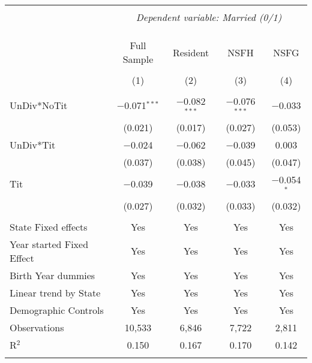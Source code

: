 
\begingroup 
\footnotesize 
\begin{tabular}{@{\extracolsep{5pt}}lcccc} 
\\[-1.8ex]\hline 
\hline \\[-1.8ex] 
 & \multicolumn{4}{c}{\textit{Dependent variable: Married (0/1)}} \\ 
\cline{2-5} 
\\[-1.8ex] &  &  &  & \\[-4.8ex] \\ 
 & Full Sample & Resident & NSFH & NSFG \\ 
\\[-1.8ex] & (1) & (2) & (3) & (4)\\ 
\hline \\[-1.8ex] 
 UnDiv*NoTit & $-$0.071$^{***}$ & $-$0.082$^{***}$ & $-$0.076$^{***}$ & $-$0.033 \\ 
  & (0.021) & (0.017) & (0.027) & (0.053) \\ 
  UnDiv*Tit & $-$0.024 & $-$0.062 & $-$0.039 & 0.003 \\ 
  & (0.037) & (0.038) & (0.045) & (0.047) \\ 
  Tit & $-$0.039 & $-$0.038 & $-$0.033 & $-$0.054$^{*}$ \\ 
  & (0.027) & (0.032) & (0.033) & (0.032) \\ 
 \hline \\[-1.8ex] 
State Fixed effects & Yes & Yes & Yes & Yes \\ 
Year started Fixed Effect & Yes & Yes & Yes & Yes \\ 
Birth Year dummies & Yes & Yes & Yes & Yes \\ 
Linear trend by State & Yes & Yes & Yes & Yes \\ 
Demographic Controls & Yes & Yes & Yes & Yes \\ 
Observations & 10,533 & 6,846 & 7,722 & 2,811 \\ 
R$^{2}$ & 0.150 & 0.167 & 0.170 & 0.142 \\ 
\hline 
\hline \\[-1.8ex] 
\end{tabular} 
\endgroup 
